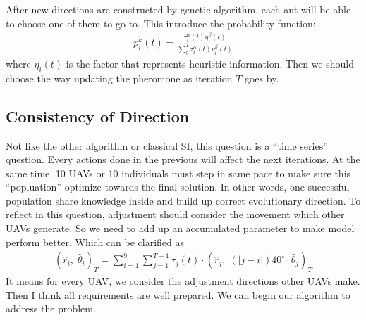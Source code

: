 \documentclass[lang=cn,a4paper,newtx]{elegantpaper}
\begin{document}
After new directions are constructed by genetic algorithm, each ant will be able to choose one of them to go to.
This introduce the probability function:
\begin{align}
  p_i^k (t) =\frac{\tau_i^{\alpha}(t) \eta_i^{\beta}(t)}{\sum_0^T \tau_i^\alpha (t) \eta_i^{\beta}(t)}
\end{align} 
where $\eta_i(t)$ is the factor that represents heuristic information.
Then we should choose the way updating the pheromone as iteration $T$ goes by.

\subsection{Consistency of Direction}
Not like the other algorithm or classical SI, this question is a ``time series'' question.
Every actions done in the previous will affect the next iterations.
At the same time, 10 UAVs or 10 individuals must step in same pace to make sure this ``popluation'' optimize towards
the final solution.
In other words, one successful population share knowledge inside and build up correct evolutionary direction.
To reflect in this question, adjustment should consider the movement which other UAVs generate.
So we need to add up an accumulated parameter to make model perform better.
Which can be clarified as 
\begin{align*}
  (\hat{r}_i,\; \hat{\theta}_i)_T = \sum_{i=1}^{9} \sum_{j=1}^{T-1} \tau_j(t)\cdot (\hat{r}_j,\; (\lvert j-i\rvert)40^{\circ}\cdot\hat{\theta}_j)_T
\end{align*}
It means for every UAV, we consider the adjustment directions other UAVs make.
Then I think all requirements are well prepared. We can begin our algorithm to address the problem.

\newpage 
\end{document}
